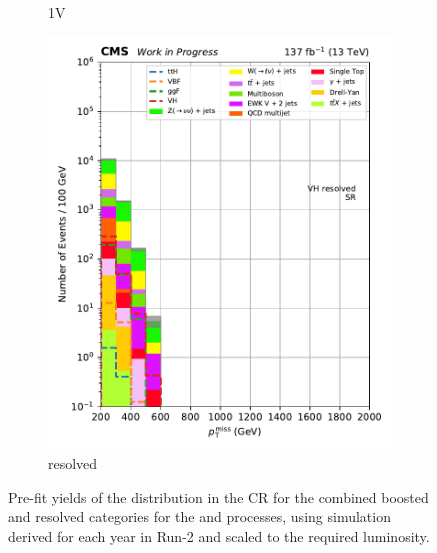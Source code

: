 \begin{figure}[htbp]
\begin{subfigure}[b]{0.24\textwidth}
        \caption{\VH 1V}
    \end{subfigure}
    \hfill
    \begin{subfigure}[b]{0.24\textwidth}
        \includegraphics[width=\textwidth]{figures/region_plots/full_Run2/region_0/VH_resolved.pdf}
        \caption{\VH resolved}
    \end{subfigure}
    \caption[Pre-fit yields of the \ptmiss distribution in the signal region for the combined boosted and resolved categories for the \ttH and \VH processes, using simulation derived for each year in Run-2 and scaled to the required luminosity]{Pre-fit yields of the \ptmiss distribution in the \singleMuCr \gls{CR} for the combined boosted and resolved categories for the \ttH and \VH processes, using simulation derived for each year in Run-2 and scaled to the required luminosity.}
    \label{fig:htoinv_sr_yields_comb2016to18}
\end{figure}






